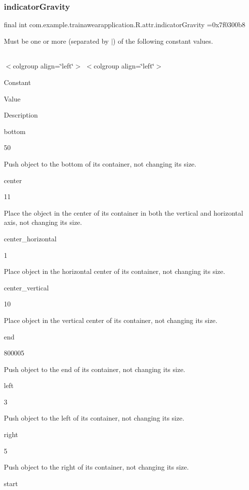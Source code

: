\subsubsection{\texorpdfstring{indicatorGravity}{indicatorGravity}}
{\footnotesize\ttfamily final int com.\+example.\+trainawearapplication.\+R.\+attr.\+indicator\+Gravity =0x7f0300b8\hspace{0.3cm}{\ttfamily [static]}}

Must be one or more (separated by \textquotesingle{}$\vert$\textquotesingle{}) of the following constant values.

\tabulinesep=1mm
\begin{longtabu}spread 0pt [c]{*{0}{|X[-1]}|}
\hline
\end{longtabu}
$<$colgroup align=\char`\"{}left\char`\"{}$>$ $<$colgroup align=\char`\"{}left\char`\"{}$>$ 

Constant

Value

Description 

bottom

50

Push object to the bottom of its container, not changing its size. 

center

11

Place the object in the center of its container in both the vertical and horizontal axis, not changing its size. 

center\+\_\+horizontal

1

Place object in the horizontal center of its container, not changing its size. 

center\+\_\+vertical

10

Place object in the vertical center of its container, not changing its size. 

end

800005

Push object to the end of its container, not changing its size. 

left

3

Push object to the left of its container, not changing its size. 

right

5

Push object to the right of its container, not changing its size. 

start

